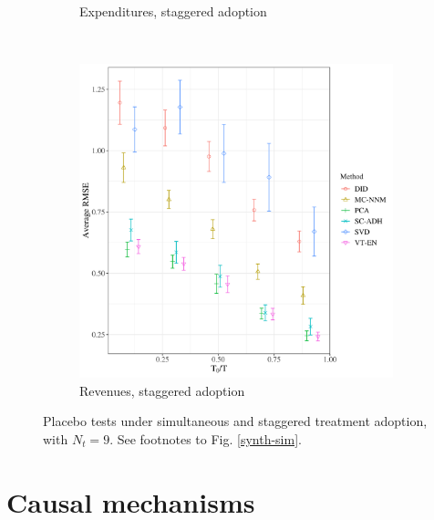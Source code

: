 \documentclass[12pt]{article}
\begin{document}
\begin{figure}[htbp]
\begin{subfigure}[t]{0.48\textwidth}
	\caption{Expenditures, staggered adoption}
\end{subfigure}
~ 
\begin{subfigure}[t]{0.48\textwidth}
	\centering
	\includegraphics[width=\textwidth]{plots/rev_pc_N_19_T_158_numruns_20_num_treated_10_simultaneuous_0.png}
	\caption{Revenues, staggered adoption}
\end{subfigure}
	\caption{Placebo tests under simultaneous and staggered treatment adoption, with $N_t = 9$. See footnotes to Fig. \ref{synth-sim}. \label{mc-sim}} 
\end{figure}

\pagebreak
\section{Causal mechanisms}
\end{document}
